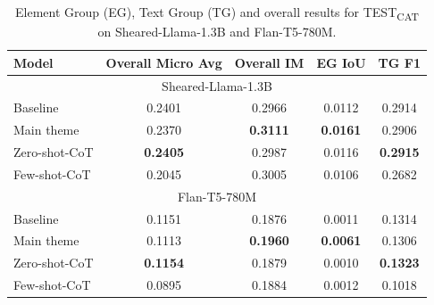 \documentclass[11pt]{article}
\begin{document}
\begin{table}[h]
\centering
\caption{Element Group (EG), Text Group (TG) and overall results for TEST\textsubscript{CAT} on Sheared-Llama-1.3B and Flan-T5-780M.} \label{tab:table2}
\label{table:performance_test_cat}
\begin{tabular}{|l|c|c|c|c|}
\hline

\textbf{Model} & \textbf{Overall Micro Avg} & \textbf{Overall IM} & \textbf{EG IoU} & \textbf{TG F1} \\
\hline\multicolumn{5}{|c|}{Sheared-Llama-1.3B}\\
\hline
Baseline & 0.2401 & 0.2966 & 0.0112 & 0.2914 \\
\hline

Main theme & 0.2370 & \textbf{0.3111} & \textbf{0.0161} & 0.2906 \\
\hline
Zero-shot-CoT & \textbf{0.2405} & 0.2987 & 0.0116 & \textbf{0.2915} \\
\hline
Few-shot-CoT & 0.2045 & 0.3005 & 0.0106 & 0.2682 \\
\hline\multicolumn{5}{|c|}{Flan-T5-780M}\\
\hline
Baseline & 0.1151 & 0.1876 & 0.0011 & 0.1314 \\
\hline

Main theme & 0.1113 & \textbf{0.1960} & \textbf{0.0061} & 0.1306 \\
\hline
Zero-shot-CoT & \textbf{0.1154} & 0.1879 & 0.0010 & \textbf{0.1323} \\
\hline
Few-shot-CoT & 0.0895 & 0.1884 & 0.0012 & 0.1018 \\
\hline
\end{tabular}
\end{table}
\end{document}
